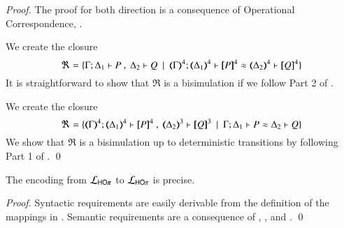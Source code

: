 \begin{proof}
	The proof for both direction is a consequence of Operational Correspondence,
	.


	\noi We create the closure
%
	\[
		\Re = \set{\horel{\Gamma}{\Delta_1}{P}{\ ,\ }{\Delta_2}{Q} \setbar \horel{\tmap{\Gamma}{4}}{\tmap{\Delta_1}{4}}{\pmap{P}{4}}{\wb}{\tmap{\Delta_2}{4}}{\pmap{Q}{4}}}
	\]
%
	\noi	It is straightforward to show that $\Re$ is a bisimulation if we follow Part 2 of
		.


	\noi We create the closure
%
	\[
		\Re = \set{\horel{\tmap{\Gamma}{4}}{\tmap{\Delta_1}{4}}{\pmap{P}{4}}{\ ,\ }{\tmap{\Delta_2}{3}}{\pmap{Q}{3}} \setbar \horel{\Gamma}{\Delta_1}{P}{\wb}{\Delta_2}{Q}}
	\]
%
	\noi	We show that $\Re$ is a bisimulation up to deterministic transitions
		by following Part 1 of .
	\qed
\end{proof}

\begin{proposition}\rm
	\label{prop:prec:pHOp_to_HOp}
	The encoding from $\tyl{L}_{\pHOp}$ to $\mathcal{L}_{\mathsf{HO}\pi}$
	is precise.
\end{proposition}

\begin{proof}
	Syntactic requirements are easily derivable from the
	definition of the mappings in .
	Semantic requirements are a consequence of
	, , and .
	\qed
\end{proof}

